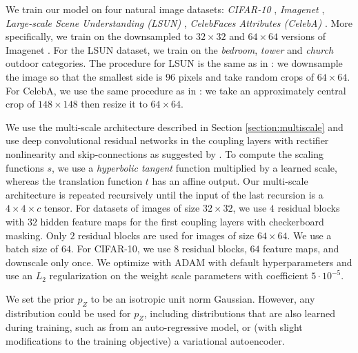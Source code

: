 \documentclass{article}
\begin{document}
We train our model on four natural image datasets: \emph{CIFAR-10} \citep{krizhevsky2009learning}, \emph{Imagenet} \citep{russakovsky2015imagenet}, \emph{Large-scale Scene Understanding (LSUN)} \citep{yu2015construction}, \emph{CelebFaces Attributes (CelebA)} \citep{liu2015faceattributes}. More specifically, we train on the downsampled to $32 \times 32$ and $64 \times64$ versions of Imagenet \citep{oord2016pixel}. For the LSUN dataset, we train on the \emph{bedroom}, \emph{tower} and \emph{church} outdoor categories. The procedure for LSUN is the same as in \citep{DBLP:journals/corr/RadfordMC15}: we downsample the image so that the smallest side is $96$ pixels and take random crops of $64 \times64$. For CelebA, we use the same procedure as in \citep{DBLP:journals/corr/LarsenSW15}: we take an approximately central crop of $148 \times 148$ then resize it to $64 \times 64$.

We use the multi-scale architecture described in Section \ref{section:multiscale} and use deep convolutional residual networks in the coupling layers with rectifier nonlinearity and skip-connections as suggested by \citep{oord2016pixel}. To compute the scaling functions $s$, we use a {\em hyperbolic tangent} function multiplied by a learned scale, whereas the translation function $t$ has an affine output. Our multi-scale architecture is repeated recursively until the input of the last recursion is a $4 \times 4 \times c$ tensor. For datasets of images of size $32 \times 32$, we use $4$ residual blocks with $32$ hidden feature maps for the first coupling layers with checkerboard masking. Only $2$ residual blocks are used for images of size $64 \times 64$. We use a batch size of $64$. For CIFAR-10, we use $8$ residual blocks, $64$ feature maps, and downscale only once. We optimize with ADAM \citep{kingma2014adam} with default hyperparameters and use an $L_{2}$ regularization on the weight scale parameters with coefficient $5 \cdot 10^{-5}$.


We set the prior $p_{Z}$ to be an isotropic unit norm Gaussian. However, any distribution could be used for $p_{Z}$, including distributions that are also learned during training, such as from an auto-regressive model, or (with slight modifications to the training objective) a variational autoencoder.
\end{document}
